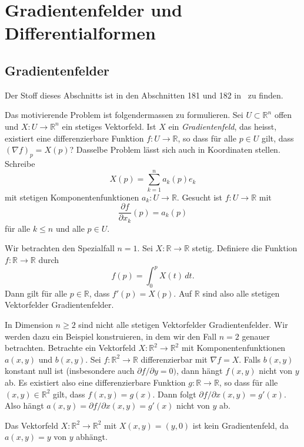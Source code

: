 \documentclass[../main.tex]{subfiles}
\begin{document}
\chapter{Gradientenfelder und Differentialformen}\label{chp:gradients}
\section{Gradientenfelder}
Der Stoff dieses Abschnitts ist in den
Abschnitten 181 und 182 in~\cite{heuser} zu finden.

Das motivierende Problem ist folgendermassen zu formulieren.
Sei $U \subset \mathbb{R}^n$ offen und
$X \colon U \to \mathbb{R}^n$ ein stetiges Vektorfeld.
Ist $X$ ein \emph{Gradientenfeld}, das heisst,
existiert
eine differenzierbare Funktion
$f \colon U \to \mathbb{R}$,
so dass für alle $p \in U$ gilt, dass ${(\nabla f)}_p = X(p)$?
Dasselbe Problem lässt sich auch in Koordinaten stellen.
Schreibe
\[
  X(p) = \sum_{k=1}^{n} a_k(p) e_k
\]
mit stetigen Komponentenfunktionen $a_k \colon U \to \mathbb{R}$.
Gesucht ist $f \colon U \to \mathbb{R}$ mit
\[
  \frac{\partial f}{\partial x_k} (p) = a_k(p)
\]
für alle
$k \leq n$ und alle $p \in U$.

\begin{specialcase}
  Wir betrachten den Spezialfall $n = 1$.
  Sei $X \colon \mathbb{R} \to \mathbb{R}$ stetig.
  Definiere die Funktion
  $f \colon \mathbb{R} \to \mathbb{R}$
  durch
  \[
    f(p) = \int_{0}^{p} X(t) \, dt.
  \]
  Dann gilt für alle $p \in \mathbb{R}$,
  dass $f'(p) = X(p)$.
  Auf $\mathbb{R}$ sind also alle stetigen Vektorfelder Gradientenfelder.
\end{specialcase}

In Dimension $n \geq 2$ sind nicht alle stetigen
Vektorfelder Gradientenfelder.
Wir werden dazu ein Beispiel konstruieren, in dem wir
den Fall $n = 2$ genauer betrachten.
Betrachte ein Vektorfeld $X \colon \mathbb{R}^2 \to \mathbb{R}^2$
mit Komponentenfunktionen $a(x, y)$ und $b(x, y)$.
Sei $f \colon \mathbb{R}^2 \to \mathbb{R}$ differenzierbar
mit $\nabla f = X$.
Falls $b(x, y)$ konstant null ist (insbesondere auch
$\partial f / \partial y = 0)$, dann hängt
$f(x, y)$ nicht von $y$ ab.
Es existiert also eine
differenzierbare Funktion
$g \colon \mathbb{R} \to \mathbb{R}$,
so dass für alle $(x, y) \in \mathbb{R}^2$ gilt,
dass $f(x, y) = g(x)$.
Dann folgt $\partial f / \partial x (x, y) = g'(x)$.
Also hängt $a(x, y) = \partial f / \partial x(x, y) = g'(x)$
nicht von $y$ ab.

\begin{example}
  Das Vektorfeld $X \colon \mathbb{R}^2 \to \mathbb{R}^2$
  mit $X(x, y) = (y, 0)$ ist kein Gradientenfeld,
  da $a(x, y) = y$ von $y$ abhängt.
\end{example}
\end{document}
